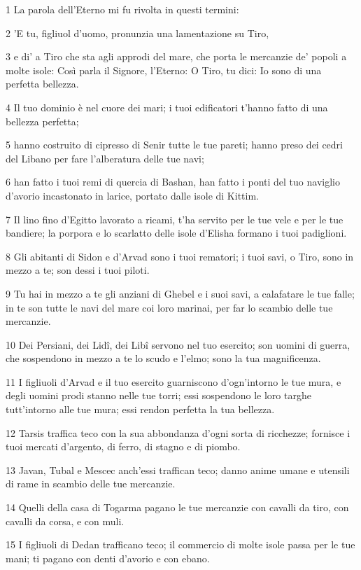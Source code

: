 \par 1 La parola dell'Eterno mi fu rivolta in questi termini:
\par 2 'E tu, figliuol d'uomo, pronunzia una lamentazione su Tiro,
\par 3 e di' a Tiro che sta agli approdi del mare, che porta le mercanzie de' popoli a molte isole: Così parla il Signore, l'Eterno: O Tiro, tu dici: Io sono di una perfetta bellezza.
\par 4 Il tuo dominio è nel cuore dei mari; i tuoi edificatori t'hanno fatto di una bellezza perfetta;
\par 5 hanno costruito di cipresso di Senir tutte le tue pareti; hanno preso dei cedri del Libano per fare l'alberatura delle tue navi;
\par 6 han fatto i tuoi remi di quercia di Bashan, han fatto i ponti del tuo naviglio d'avorio incastonato in larice, portato dalle isole di Kittim.
\par 7 Il lino fino d'Egitto lavorato a ricami, t'ha servito per le tue vele e per le tue bandiere; la porpora e lo scarlatto delle isole d'Elisha formano i tuoi padiglioni.
\par 8 Gli abitanti di Sidon e d'Arvad sono i tuoi rematori; i tuoi savi, o Tiro, sono in mezzo a te; son dessi i tuoi piloti.
\par 9 Tu hai in mezzo a te gli anziani di Ghebel e i suoi savi, a calafatare le tue falle; in te son tutte le navi del mare coi loro marinai, per far lo scambio delle tue mercanzie.
\par 10 Dei Persiani, dei Lidî, dei Libî servono nel tuo esercito; son uomini di guerra, che sospendono in mezzo a te lo scudo e l'elmo; sono la tua magnificenza.
\par 11 I figliuoli d'Arvad e il tuo esercito guarniscono d'ogn'intorno le tue mura, e degli uomini prodi stanno nelle tue torri; essi sospendono le loro targhe tutt'intorno alle tue mura; essi rendon perfetta la tua bellezza.
\par 12 Tarsis traffica teco con la sua abbondanza d'ogni sorta di ricchezze; fornisce i tuoi mercati d'argento, di ferro, di stagno e di piombo.
\par 13 Javan, Tubal e Mescec anch'essi traffican teco; danno anime umane e utensili di rame in scambio delle tue mercanzie.
\par 14 Quelli della casa di Togarma pagano le tue mercanzie con cavalli da tiro, con cavalli da corsa, e con muli.
\par 15 I figliuoli di Dedan trafficano teco; il commercio di molte isole passa per le tue mani; ti pagano con denti d'avorio e con ebano.
